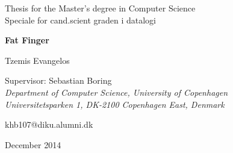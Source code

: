 \begin{titlepage}
    \begin{center}
        \vspace*{3cm}
        \LARGE
        Thesis for the Master’s degree in Computer Science\\
        \large
        Speciale for cand.scient graden i datalogi
        
        \vspace{0.35cm}
        \Huge
        \textbf{Fat Finger}
        
        \vspace{0.25cm}
        \LARGE
        Tzemis Evangelos

        \vspace{0.7cm}
        \large
        Supervisor: Sebastian Boring\\
        \vspace{0.1cm}
        \large
        \textit{Department of Computer Science, University of Copenhagen \\
        Universitetsparken 1, DK-2100 Copenhagen East, Denmark}

        \vspace{0.15cm}
        \large
        khb107@diku.alumni.dk

        \vfill

        
        \Large
        December 2014

    
        
        
        
        
    \end{center}
\end{titlepage}